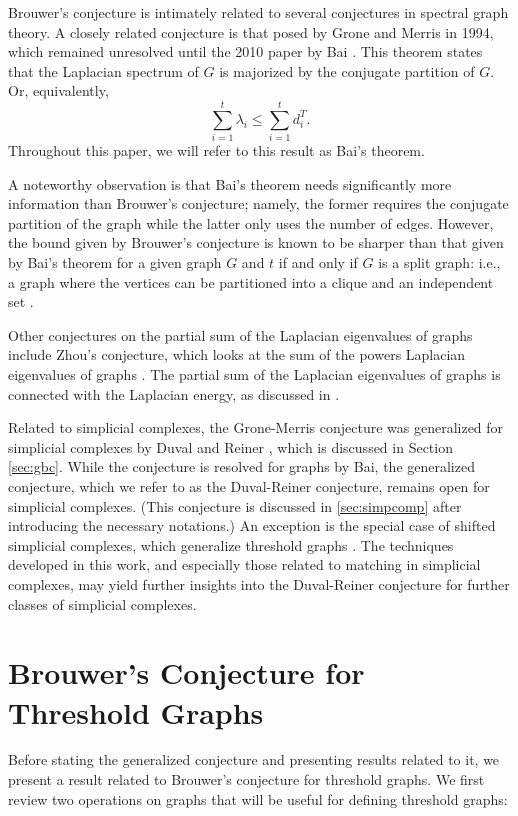 \documentclass[11pt]{article}
\begin{document}
Brouwer's conjecture is intimately related to several conjectures in spectral graph theory. A closely related conjecture is that posed by Grone and Merris in 1994, which remained unresolved until the 2010 paper by Bai \cite{Bai,GM}. This theorem states that the Laplacian spectrum of $G$ is majorized by the conjugate partition of $G$. Or, equivalently,
\[
\sum^{t}_{i=1} \lambda_i \leq \sum^{t}_{i=1} d^T_i.
\]
Throughout this paper, we will refer to this result as Bai's theorem.

A noteworthy observation is that Bai's theorem needs significantly more information than Brouwer's conjecture; namely, the former requires the conjugate partition of the graph while the latter only uses the number of edges. However, the bound given by Brouwer's conjecture is known to be sharper than that given by Bai's theorem for a given graph $G$ and $t$ if and only if $G$ is a split graph: i.e., a graph where the vertices can be partitioned into a clique and an independent set \cite{M}.

Other conjectures on the partial sum of the Laplacian eigenvalues of graphs include Zhou's conjecture, which looks at the sum of the powers Laplacian eigenvalues of graphs \cite{Z}. The partial sum of the Laplacian eigenvalues of graphs is connected with the Laplacian energy, as discussed in \cite{CLF,GZ,lapenergy,Z2}.

Related to simplicial complexes, the Grone-Merris conjecture was generalized for simplicial complexes by Duval and Reiner \cite{DR}, which is discussed in Section \ref{sec:gbc}. While the conjecture is resolved for graphs by Bai, the generalized conjecture, which we refer to as the Duval-Reiner conjecture, remains open for simplicial complexes. (This conjecture is discussed in \ref{sec:simpcomp} after introducing the necessary notations.) An exception is the special case of shifted simplicial complexes, which generalize threshold graphs \cite{DR}. The techniques developed in this work, and especially those related to matching in simplicial complexes, may yield further insights into the Duval-Reiner conjecture for further classes of simplicial complexes.



\section{Brouwer's Conjecture for Threshold Graphs}\label{sec:thresh}

Before stating the generalized conjecture and presenting results related to it, we present a result related to Brouwer's conjecture for threshold graphs. We first review two operations on graphs that will be useful for defining threshold graphs:
\end{document}
